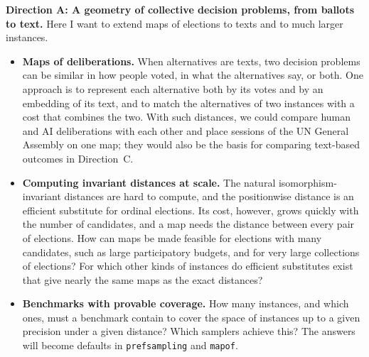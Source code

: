 \documentclass[11pt,a4paper]{article}
\newcommand{\direction}[1]{\textbf{\color{accent}#1}}
\newcommand{\problem}[1]{\item \textbf{#1}}
\begin{document}
\direction{Direction A: A geometry of collective decision problems, from ballots to text.}
Here I want to extend maps of elections to texts and to much larger
instances.
\begin{itemize}
  \problem{Maps of deliberations.} When alternatives are texts, two decision
  problems can be similar in how people voted, in what the alternatives say,
  or both. One approach is to represent each alternative both by its votes
  and by an embedding of its text, and to match the alternatives of two
  instances with a cost that combines the two. With such distances, we could compare human and AI deliberations with each
other and place sessions of the UN General Assembly on one map; they would
also be the basis for comparing text-based outcomes in Direction~C.
  \problem{Computing invariant distances at scale.} The natural
  isomorphism-invariant distances are hard to compute, and the positionwise
  distance is an efficient substitute for ordinal elections. Its cost,
  however, grows quickly with the number of candidates, and a map needs the
  distance between every pair of elections. How can maps be made
  feasible for elections with many candidates, such as large participatory
  budgets, and for very large collections of elections?
  For which other kinds of instances do efficient substitutes exist that give
  nearly the same maps as the exact distances?
  \problem{Benchmarks with provable coverage.} How many instances, and which
  ones, must a benchmark contain to cover the space of instances up to a given
  precision under a given distance? Which samplers achieve this? The answers
  will become defaults in \texttt{prefsampling} and \texttt{mapof}.
\end{itemize}
\end{document}
